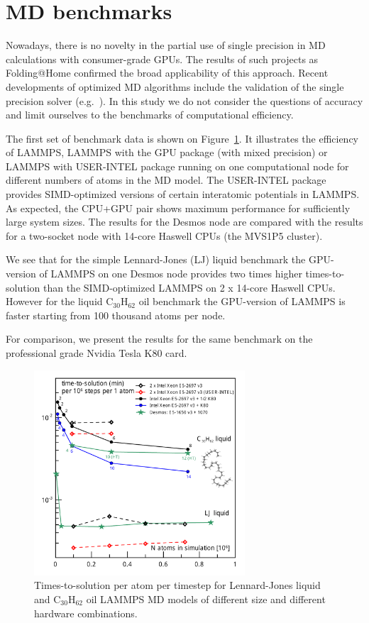 \documentclass{llncs}
\begin{document}
\section{MD benchmarks}

Nowadays, there is no novelty in the partial use of single precision in MD calculations with consumer-grade GPUs. The results of such projects as Folding@Home confirmed the broad applicability of this approach. Recent developments of optimized MD algorithms include the validation of the single precision solver (e.g.~\cite{Hohnerbach-2016}). In this study we do not consider the questions of accuracy and limit ourselves to the benchmarks of computational efficiency.

The first set of benchmark data is shown on Figure~\ref{c30_lj}. It illustrates the efficiency of LAMMPS, LAMMPS with the GPU package (with mixed precision) or LAMMPS with USER-INTEL package running on one computational node for different numbers of atoms in the MD model. The USER-INTEL package provides SIMD-optimized versions of certain interatomic potentials in LAMMPS. As expected, the CPU+GPU pair shows maximum performance for sufficiently large system sizes. The results for the Desmos node are compared with the results for a two-socket node with 14-core Haswell CPUs (the MVS1P5 cluster). 

We see that for the simple Lennard-Jones (LJ) liquid benchmark the GPU-version of LAMMPS on one Desmos node provides two times higher times-to-solution than the SIMD-optimized LAMMPS on 2 x 14-core Haswell CPUs. However for the liquid C$_{30}$H$_{62}$ oil benchmark the GPU-version of LAMMPS is faster starting from 100 thousand atoms per node.

For comparison, we present the results for the same benchmark on the professional grade Nvidia Tesla K80 card.

\begin{figure}
\centering
\includegraphics[width=0.7\textwidth]{img/c30_lj.pdf}
\caption{\label{c30_lj} Times-to-solution per atom per timestep for Lennard-Jones liquid and C$_{30}$H$_{62}$ oil LAMMPS MD models of different size and different hardware combinations.}
\end{figure}
\end{document}
